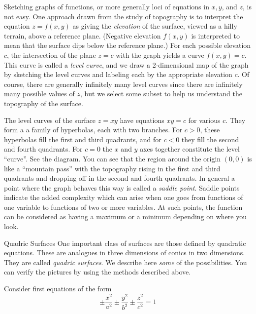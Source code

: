 Sketching graphs of functions, or more generally loci of equations
in $x, y$, and $z$, is not easy.   One approach drawn from the
study of topography is to interpret the equation $z = f(x,y)$ as
giving the {\it elevation\/} of the surface, viewed as a hilly
terrain, above a reference plane.  (Negative elevation
 $f(x,y)$ is
interpreted to mean that the surface dips below the reference plane.)
For each possible elevation $c$,
 the intersection of the plane $z = c$ with the graph
yields a curve $f(x,y) = c$.  This curve is called a {\it level
curve}, and we draw a 2-dimensional map of the graph by sketching
%
the level curves and labeling each by the appropriate elevation
$c$.  Of course, there are generally infinitely many level curves
since there are infinitely many possible values of $z$, but we
select some subset to help us understand the topography of the
surface.
\medskip
\centerline{}
\medskip
\nextex
{}
The level curves of the surface $z = xy$ have equations
$xy = c$ for various $c$.  They form a 
a family of hyperbolas, each with two branches.  For $c > 0$,
these hyperbolas fill the first and third quadrants, and for
$c < 0$ they fill the second and fourth quadrants.  For $c  = 0$
the $x$ and $y$ axes together constitute the level ``curve''.
See the diagram.
You can see that the region around the origin $(0,0)$ is like a
``mountain pass'' with the topography rising in the first and
third quadrants and dropping off in the second and fourth quadrants.
In general a point where the graph behaves this way is called
a {\it saddle point}.   Saddle points indicate the added complexity
which can arise when one goes from functions of one variable to
functions of two or more variables.  At such points, the function
can be considered as having a maximum  or
 a minimum depending on where you
look.
\endexample
\smallskip
{}
\smallskip

\subhead Quadric Surfaces \endsubhead
One important class of surfaces are those defined by quad\-rat\-ic
equations.  These are analogues in three dimensions of
conics in two dimensions.  They are called {\it quadric
surfaces}.  We describe here {\it some\/} of the possibilities.
You can verify the pictures by using the methods described above.
%

Consider first equations of the form
$$
   \pm \frac{x^2}{a^2} 
   \pm \frac{y^2}{b^2} 
   \pm \frac{z^2}{c^2} = 1
$$


